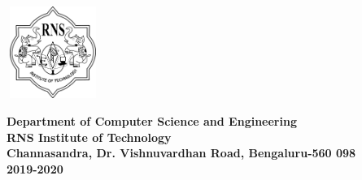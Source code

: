 \begin{titlepage}
\begin{center}
\renewcommand\tabularxcolumn[1]{}

\includegraphics[width=3cm, height=3cm]{../static/media/RNS_logo.png}

\textup{\normalsize {\textcolor{darkbrown}{\bf Department of Computer Science and Engineering} \\ {\textcolor{darkbrown}{\bf \bf{RNS Institute of Technology}}}}}\\
\textup{\small {\textcolor{darkbrown}{\bf Channasandra, Dr. Vishnuvardhan Road, Bengaluru-560 098}\\ \textbf {\textcolor{darkbrown}{2019-2020}}}}
\vfill

\end{center}
\end{titlepage}
\pagebreak